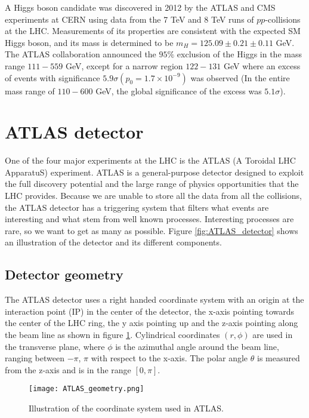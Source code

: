 \documentclass[10pt, aps, twocolumn, a4paper, nofootinbib]{revtex4}
\begin{document}
A Higgs boson candidate was discovered in 2012 by the ATLAS and CMS experiments at CERN using data from the 7 TeV and 8 TeV runs of $pp$-collisions at the LHC. Measurements of its properties are consistent with the expected SM Higgs boson, and its mass is determined to be  $m_H = 125.09 \pm 0.21 \pm 0.11$ GeV. The ATLAS collaboration announced\citep{ObsNewParticle2012} the $95\%$ exclusion of the Higgs in the mass range $111-559$ GeV, except for a narrow region $122-131$ GeV where an excess of events with significance $5.9 \sigma(p_0 = 1.7\times10^{-9})$ was observed (In the entire mass range of $110-600$ GeV, the global significance of the excess was $5.1\sigma$).

\section{ATLAS detector}

One of the four major experiments at the LHC is the ATLAS (A Toroidal LHC ApparatuS) experiment\citep{ATLAS_2008}. ATLAS is a general-purpose detector designed to exploit the full discovery potential and the large range of physics opportunities that the LHC provides. Because we are unable to store all the data from all the collisions, the ATLAS detector has a triggering system that filters what events are interesting and what stem from well known processes. Interesting processes are rare, so we want to get as many as possible. Figure \ref{fig:ATLAS_detector} shows an illustration of the detector and its different components.\\ 

\subsection{Detector geometry}
The ATLAS detector uses a right handed coordinate system with an origin at the interaction point (IP) in the center of the detector,
the x-axis pointing towards the center of the LHC ring, the y axis pointing up and the z-axis pointing along the beam line as shown in figure \ref{fig:ALTAS_geometry}. Cylindrical coordinates $(r,\phi)$ are used in the transverse plane, where $\phi$ is the azimuthal angle around the beam line, ranging between $-\pi$, $\pi$ with respect to the x-axis. The polar angle $\theta$ is measured from the z-axis and is in the range $[0,\pi]$. \\

\begin{figure}
\centering 
\texttt{[image: ATLAS\_geometry.png]}
\caption{Illustration of the coordinate system used in ATLAS. \citep{Schott_2014}\label{fig:ALTAS_geometry}}
\end{figure}
\end{document}
